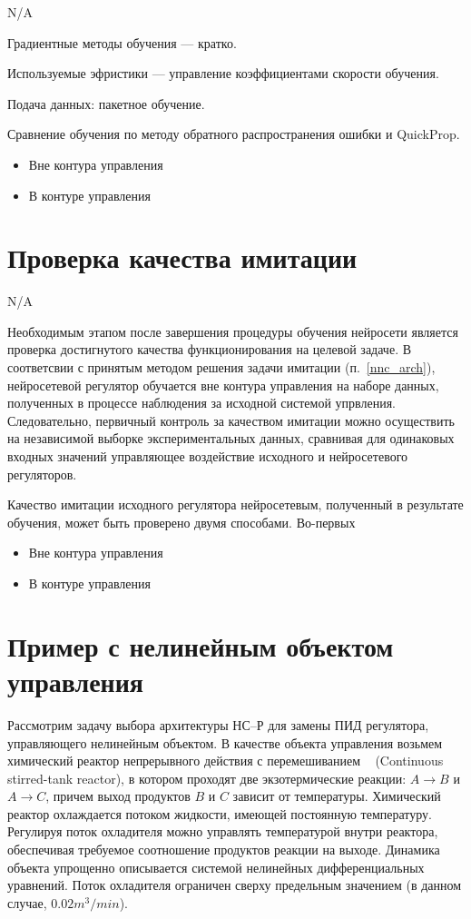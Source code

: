{\LARGE N/A}

Градиентные методы обучения --- кратко.

Используемые эфристики --- управление коэффициентами скорости обучения.

Подача данных: пакетное обучение.

Сравнение обучения по методу обратного распространения ошибки и QuickProp.

\begin{itemize}
\item Вне контура управления
\item В контуре управления
\end{itemize}

\section{Проверка качества имитации}

{\LARGE N/A}

Необходимым этапом после завершения процедуры обучения нейросети
является проверка достигнутого качества функционирования на целевой задаче.  В
соответсвии с принятым методом решения задачи имитации
(п.~\ref{nnc_arch}), нейросетевой регулятор обучается вне контура
управления на наборе данных, полученных в процессе наблюдения за
исходной системой упрвления.  Следовательно, первичный контроль за
качеством имитации можно осуществить на независимой выборке
экспериментальных данных, сравнивая для одинаковых входных значений
управляющее воздействие исходного и нейросетевого регуляторов.

Качество имитации исходного регулятора нейросетевым, полученный в
результате обучения, может быть проверено двумя способами.  Во-первых 


\begin{itemize}
\item Вне контура управления
\item В контуре управления
\end{itemize}

\section{Пример с нелинейным объектом управления}

Рассмотрим задачу выбора архитектуры НС--Р для замены ПИД регулятора,
управляющего нелинейным объектом.  В качестве объекта управления
возьмем химический реактор непрерывного действия с перемешиванием
~\cite{wiki-cstr} (Continuous stirred-tank reactor), в котором
проходят две экзотермические реакции: $A\rightarrow B$ и $A\rightarrow
C$, причем выход продуктов $B$ и $C$ зависит от температуры.
Химический реактор охлаждается потоком жидкости, имеющей постоянную
температуру.  Регулируя поток охладителя можно управлять температурой
внутри реактора, обеспечивая требуемое соотношение продуктов реакции
на выходе.  Динамика объекта упрощенно описывается системой нелинейных
дифференциальных уравнений.  Поток охладителя ограничен сверху
предельным значением (в данном случае, $0.02 m^3/min$).

